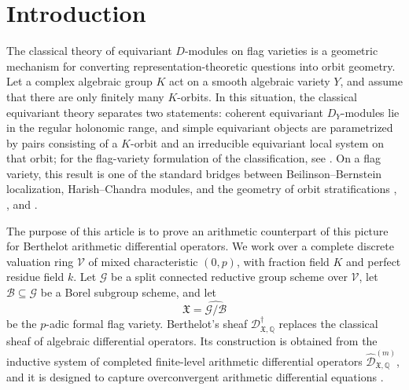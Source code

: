 \documentclass[11pt]{amsart}
\theoremstyle{plain}
\theoremstyle{definition}
\theoremstyle{remark}
\begin{document}
\maketitle


\section{Introduction}

The classical theory of equivariant \(D\)-modules on flag varieties is a
geometric mechanism for converting representation-theoretic questions into
orbit geometry.  Let a complex algebraic group \(K\) act on a smooth algebraic
variety \(Y\), and assume that there are only finitely many \(K\)-orbits.  In
this situation, the classical equivariant theory separates two statements:
coherent equivariant \(D_Y\)-modules lie in the regular holonomic range, and
simple equivariant objects are parametrized by pairs consisting of a
\(K\)-orbit and an irreducible equivariant local system on that orbit; for the
flag-variety formulation of the classification, see
\cite[Theorem 11.6]{KashiwaraFlag}.  On a flag variety, this result is one of
the standard bridges between Beilinson--Bernstein localization,
Harish--Chandra modules, and the geometry of orbit stratifications
\cite[Th\'eor\`eme principal]{BeilinsonBernstein}, \cite[Theorem 11.6]{KashiwaraFlag}, and \cite[\S1]{KashiwaraSchmid}.

The purpose of this article is to prove an arithmetic counterpart of this
picture for Berthelot arithmetic differential operators.  We work over a
complete discrete valuation ring \(\mathcal V\) of mixed characteristic
\((0,p)\), with fraction field \(K\) and perfect residue field \(k\).  Let
\(\mathcal G\) be a split connected reductive group scheme over \(\mathcal V\),
let \(\mathcal B\subseteq\mathcal G\) be a Borel subgroup scheme, and let
\[
  \mathfrak X=\widehat{\mathcal G/\mathcal B}
\]
be the \(p\)-adic formal flag variety.  Berthelot's sheaf
\(\mathscr D^\dagger_{\mathfrak X,\mathbb Q}\) replaces the classical sheaf of
algebraic differential operators.  Its construction is obtained from the
inductive system of completed finite-level arithmetic differential operators
\(\widehat{\mathscr D}^{(m)}_{\mathfrak X,\mathbb Q}\), and it is designed to
capture overconvergent arithmetic differential equations
\cite[Sections 2.2 and 3]{BerthelotDModules}.
\end{document}
